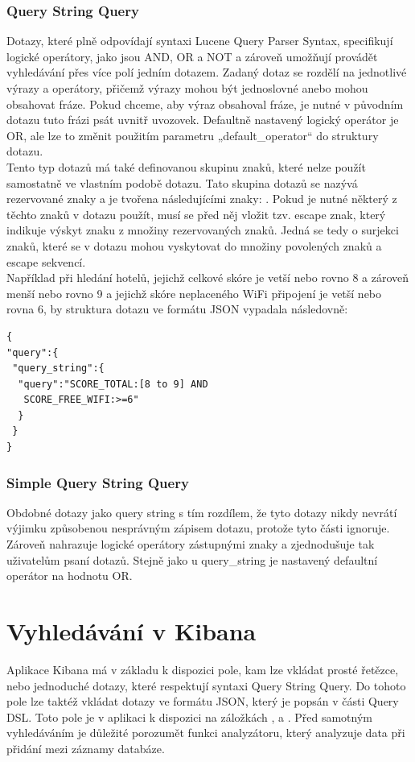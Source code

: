 \documentclass[czech,BP]{thesiskiv}
\begin{document}
\subsubsection{Query String Query}
Dotazy, které plně odpovídají syntaxi Lucene Query Parser Syntax, specifikují logické operátory, jako jsou AND, OR a NOT a zároveň umožňují provádět vyhledávání přes více polí jedním dotazem. Zadaný dotaz se rozdělí na jednotlivé výrazy a operátory, přičemž výrazy mohou být jednoslovné anebo mohou obsahovat fráze. Pokud chceme, aby výraz obsahoval fráze, je nutné v původním dotazu tuto frázi psát uvnitř uvozovek. Defaultně nastavený logický operátor je OR, ale lze to změnit použitím parametru „default\_operator“ do struktury dotazu.
\\
Tento typ dotazů má také definovanou skupinu znaků, které nelze použít samostatně ve vlastním podobě dotazu. Tato skupina dotazů se nazývá rezervované znaky a je tvořena následujícími znaky: . Pokud je nutné některý z těchto znaků v dotazu použít, musí se před něj vložit tzv. escape znak, který indikuje výskyt znaku z množiny rezervovaných znaků. Jedná se tedy o surjekci znaků, které se v dotazu mohou vyskytovat do množiny povolených znaků a escape sekvencí.
\\
Například při hledání hotelů, jejichž celkové skóre je vetší nebo rovno 8 a zároveň menší nebo rovno 9 a jejichž skóre neplaceného WiFi připojení je vetší nebo rovna 6, by struktura dotazu ve formátu JSON vypadala následovně:

\begin{lstlisting}[xleftmargin=0.2\textwidth]
{
"query":{
 "query_string":{
  "query":"SCORE_TOTAL:[8 to 9] AND 
   SCORE_FREE_WIFI:>=6"
  }
 }
}
\end{lstlisting}

	
\subsubsection{Simple Query String Query}
Obdobné dotazy jako query string s tím rozdílem, že tyto dotazy nikdy nevrátí výjimku způsobenou nesprávným zápisem dotazu, protože tyto části ignoruje. Zároveň nahrazuje logické operátory zástupnými znaky a zjednodušuje tak uživatelům psaní dotazů.  Stejně jako u query\_string je nastavený defaultní operátor na hodnotu OR.

\section{Vyhledávání v Kibana}
Aplikace Kibana má v základu k dispozici pole, kam lze vkládat prosté řetězce, nebo  jednoduché dotazy, které respektují syntaxi Query String Query. Do tohoto pole lze taktéž vkládat dotazy ve formátu JSON, který je popsán v části Query DSL. Toto pole je v aplikaci k dispozici na záložkách ,  a . Před samotným vyhledáváním je důležité porozumět funkci analyzátoru, který analyzuje data při přidání mezi záznamy databáze.
\end{document}
